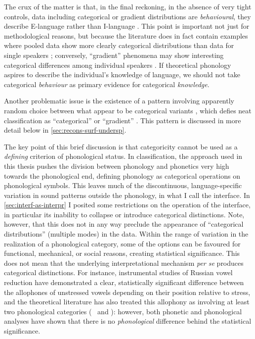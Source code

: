 The crux of the matter is that, in the final reckoning, in the absence of very tight controls, data including categorical or gradient distributions are \emph{behavioural}, \ie they describe E-language rather than I-language \citep[\cfm][]{lacy09:_phonol}. This point is important not just for methodological reasons, but because the literature does in fact contain examples where pooled data show more clearly categorical distributions than data for single speakers \citep{padgett-tabain,scobbie06:_flexib_englis_vot,scobbie07:_inter}; conversely, \enquote{gradient} phenomena may show interesting categorical differences among individual speakers \citep{ellis02:_categ}. If theoretical phonology aspires to describe the individual's knowledge of language, we should not take categorical \emph{behaviour} as primary evidence for categorical \emph{knowledge}.

Another problematic issue is the existence of a pattern involving apparently random choice between what appear to be categorical variants \citep{baayen11:_mixed}, which defies neat classification as \enquote{categorical} or \enquote{gradient} \citep[for examples, see][]{scobbie09:_dutch,mielke10:_variab_americ_englis,strycharczuk11:_explain,bermudez-oterong:_cycles}. This pattern is discussed in more detail below in  \cref{sec:recons-surf-undersp}.

The key point of this brief discussion is that categoricity cannot be used as a \emph{defining} criterion of phonological status. In  classification, the approach used in this thesis pushes the division between phonology and phonetics very high towards the phonological end, defining phonology as categorical operations on phonological symbols. This leaves much of the discontinuous, language\hyp specific variation in sound patterns outside the phonology, in what I call the interface. In \cref{sec:interf-as-interpr} I posited some restrictions on the operation of the interface, in particular its inability to collapse or introduce categorical distinctions. Note, however, that this does not in any way preclude the appearance of \enquote{categorical distributions} (\ie multiple modes) in the data. Within the range of variation in the realization of a phonological category, some of the options can be favoured for functional, mechanical, or social reasons, creating statistical significance. This does not mean that the underlying interpretational mechanism \emph{per se} produces categorical distinctions. For instance, instrumental studies of Russian vowel reduction \citep[\egm][]{padgett-tabain} have demonstrated a clear, statistically significant difference between the allophones of unstressed vowels depending on their position relative to stress, and the theoretical literature \citep[\egm][]{crosswhite} has also treated this allophony as involving at least two phonological categories (\eg\ \ipa{[a]} and \ipa{[ə]}): however, both phonetic and phonological analyses \citep{barnesbook,barnes2007,iosad10:_motiv} have shown that there is no \emph{phonological} difference behind the statistical significance.

